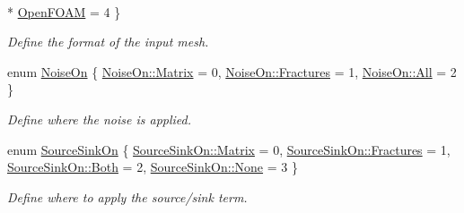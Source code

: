 \begin{DoxyCompactItemize}
\\*
\hyperlink{classFVCode3D_1_1Data_a6a9aa6abc2ca3c85be8578d82a61a9c6a568f155439735c175038b49a538cd6ce}{Open\+F\+O\+AM} = 4
 \}\begin{DoxyCompactList}\small\item\em Define the format of the input mesh. \end{DoxyCompactList}
\item 
enum \hyperlink{classFVCode3D_1_1Data_a983fdc14aa355a7c9fd614b9655a3552}{Noise\+On} \{ \hyperlink{classFVCode3D_1_1Data_a983fdc14aa355a7c9fd614b9655a3552af53df0293e169f562bc1d9a20e1d2589}{Noise\+On\+::\+Matrix} = 0, 
\hyperlink{classFVCode3D_1_1Data_a983fdc14aa355a7c9fd614b9655a3552aaa3a14735ecc914d217c516ad93fb640}{Noise\+On\+::\+Fractures} = 1, 
\hyperlink{classFVCode3D_1_1Data_a983fdc14aa355a7c9fd614b9655a3552ab1c94ca2fbc3e78fc30069c8d0f01680}{Noise\+On\+::\+All} = 2
 \}\begin{DoxyCompactList}\small\item\em Define where the noise is applied. \end{DoxyCompactList}
\item 
enum \hyperlink{classFVCode3D_1_1Data_a4d66e2e205b350cb240820540339e1a3}{Source\+Sink\+On} \{ \hyperlink{classFVCode3D_1_1Data_a4d66e2e205b350cb240820540339e1a3af53df0293e169f562bc1d9a20e1d2589}{Source\+Sink\+On\+::\+Matrix} = 0, 
\hyperlink{classFVCode3D_1_1Data_a4d66e2e205b350cb240820540339e1a3aaa3a14735ecc914d217c516ad93fb640}{Source\+Sink\+On\+::\+Fractures} = 1, 
\hyperlink{classFVCode3D_1_1Data_a4d66e2e205b350cb240820540339e1a3a130c5b3473c57faa76e2a1c54e26f88e}{Source\+Sink\+On\+::\+Both} = 2, 
\hyperlink{classFVCode3D_1_1Data_a4d66e2e205b350cb240820540339e1a3a6adf97f83acf6453d4a6a4b1070f3754}{Source\+Sink\+On\+::\+None} = 3
 \}\begin{DoxyCompactList}\small\item\em Define where to apply the source/sink term. \end{DoxyCompactList}
\end{DoxyCompactItemize}
